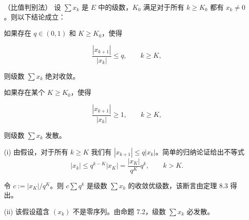 \begin{theorem}

（比值判别法） 设 $ \sum x_k $ 是 $ E $ 中的级数，$ K_0 $ 满足对于所有 $ k \geq K_0 $ 都有 $ x_k \neq 0 $。则以下结论成立：

\begin{subitems}
\item

如果存在 $ q \in (0,1) $ 和 $ K \geq K_0 $，使得

\[
\frac{|x_{k+1}|}{|x_{k}|}\leq q,\qquad k\geq K,
\]

则级数 $ \sum x_k $ 绝对收敛。

\item

如果存在某个 $ K \geq K_{0} $，使得

\[
\frac{|x_{k+1}|}{|x_{k}|}\geq1,\qquad k\geq K,
\]

则级数 $ \sum x_k $ 发散。

\proofhead
(i) 由假设，对于所有 $ k \geq K $ 我们有 $ |x_{k+1}| \leq q|x_k| $。简单的归纳论证给出不等式
\[
\left|x_{k}\right|\leq q^{k-K}\left|x_{K}\right|=\frac{\left|x_{K}\right|}{q^{K}}q^{k},\qquad k>K.
\]

令 $ c := |x_K|/q^K $。则 $ c \sum q^k $ 是级数 $ \sum x_k $ 的收敛优级数，该断言由定理 8.3 得出。

\end{subitems}

(ii) 该假设蕴含 $ (x_k) $ 不是零序列。由命题 7.2，级数 $ \sum x_k $ 必发散。

\end{theorem}

